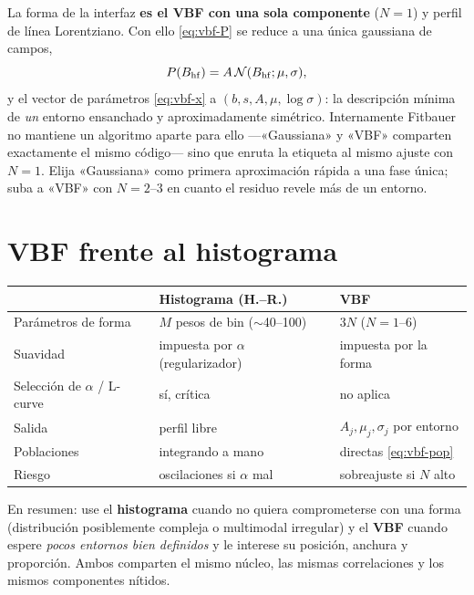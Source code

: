 La forma  de la interfaz \textbf{es el VBF con una sola
componente} ($N=1$) y perfil de línea Lorentziano. Con ello \eqref{eq:vbf-P} se
reduce a una única gaussiana de campos,
\begin{equation}
  P(B_{\mathrm{hf}}) = A\,\mathcal N(B_{\mathrm{hf}};\mu,\sigma),
\end{equation}
y el vector de parámetros \eqref{eq:vbf-x} a $(b,s,A,\mu,\log\sigma)$: la
descripción mínima de \emph{un} entorno ensanchado y aproximadamente simétrico.
Internamente Fitbauer no mantiene un algoritmo aparte para ello —«Gaussiana» y
«VBF» comparten exactamente el mismo código— sino que enruta la etiqueta al mismo
ajuste con $N=1$. Elija «Gaussiana» como primera aproximación rápida a una fase
única; suba a «VBF» con $N=2$--$3$ en cuanto el residuo revele más de un entorno.

\section{VBF frente al histograma}
\label{sec:vbf-vs-hist}

\begin{center}
\small
\begin{tabular}{@{}p{}p{}p{}@{}}
\toprule
 & \textbf{Histograma (H.--R.)} & \textbf{VBF} \\
\midrule
Parámetros de forma & $M$ pesos de bin ($\sim$40--100) & $3N$ ($N=1$--$6$) \\
Suavidad & impuesta por $\alpha$ (regularizador) & impuesta por la forma \\
Selección de $\alpha$ / L-curve & sí, crítica & no aplica \\
Salida & perfil libre & $A_j,\mu_j,\sigma_j$ por entorno \\
Poblaciones & integrando a mano & directas \eqref{eq:vbf-pop} \\
Riesgo & oscilaciones si $\alpha$ mal & sobreajuste si $N$ alto \\
\bottomrule
\end{tabular}
\end{center}

En resumen: use el \textbf{histograma} cuando no quiera comprometerse con una
forma (distribución posiblemente compleja o multimodal irregular) y el
\textbf{VBF} cuando espere \emph{pocos entornos bien definidos} y le interese su
posición, anchura y proporción. Ambos comparten el mismo núcleo, las mismas
correlaciones y los mismos componentes nítidos.

